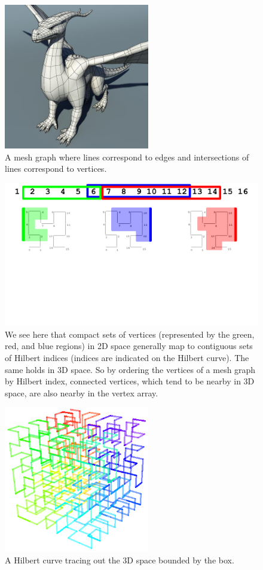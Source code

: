 \documentclass[journal]{IEEEtran}
\begin{document}
\begin{figure}[!t]
\centering
\includegraphics[width=2.5in]{dragon}
\caption{A mesh graph where lines correspond to edges and intersections of lines correspond to vertices.}
\label{fig_mesh}
\end{figure}

\begin{figure}[ht]
\centering
\includegraphics[trim=0cm 7cm 0cm 0cm, width=\textwidth,keepaspectratio]{hilbert_compact}
\caption{We see here that compact sets of vertices (represented by the green, red, and blue regions) in 2D space generally map to contiguous sets of Hilbert indices (indices are indicated on the Hilbert curve). The same holds in 3D space. So by ordering the vertices of a mesh graph by Hilbert index, connected vertices, which tend to be nearby in 3D space, are also nearby in the vertex array.}
\label{fig_hil_comp}
\end{figure}

\begin{figure}[!t]
\centering
\includegraphics[width=2.5in]{hilbert3d}
\caption{A Hilbert curve tracing out the 3D space bounded by the box.}
\label{fig_hil3d}
\end{figure}
\end{document}
